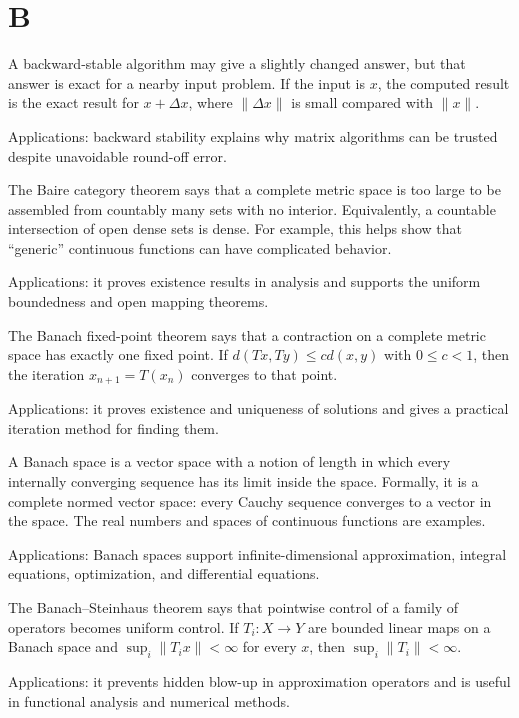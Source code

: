 \chapter*{B}
\label{chap:b}

A backward-stable algorithm may give a slightly changed answer, but that answer is exact for a nearby input problem. If the input is $x$, the computed result is the exact result for $x+\Delta x$, where $\|\Delta x\|$ is small compared with $\|x\|$. \par\noindent Applications: backward stability explains why matrix algorithms can be trusted despite unavoidable round-off error.

The Baire category theorem says that a complete metric space is too large to be assembled from countably many sets with no interior. Equivalently, a countable intersection of open dense sets is dense. For example, this helps show that “generic” continuous functions can have complicated behavior. \par\noindent Applications: it proves existence results in analysis and supports the uniform boundedness and open mapping theorems.

The Banach fixed-point theorem says that a contraction on a complete metric space has exactly one fixed point. If $d(Tx,Ty)\leq cd(x,y)$ with $0\le c<1$, then the iteration $x_{n+1}=T(x_n)$ converges to that point. \par\noindent Applications: it proves existence and uniqueness of solutions and gives a practical iteration method for finding them.

A Banach space is a vector space with a notion of length in which every internally converging sequence has its limit inside the space. Formally, it is a complete normed vector space: every Cauchy sequence converges to a vector in the space. The real numbers and spaces of continuous functions are examples. \par\noindent Applications: Banach spaces support infinite-dimensional approximation, integral equations, optimization, and differential equations.

The Banach--Steinhaus theorem says that pointwise control of a family of operators becomes uniform control. If $T_i:X\to Y$ are bounded linear maps on a Banach space and $\sup_i\|T_i x\|<\infty$ for every $x$, then $\sup_i\|T_i\|<\infty$. \par\noindent Applications: it prevents hidden blow-up in approximation operators and is useful in functional analysis and numerical methods.

